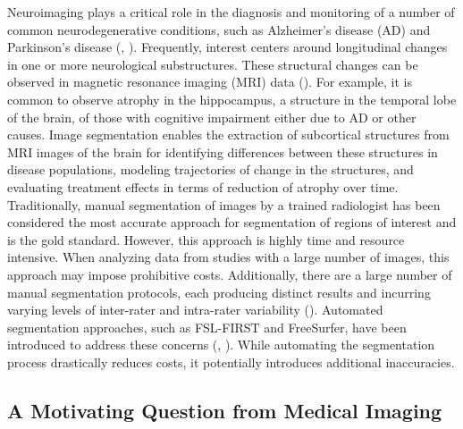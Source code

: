 \documentclass[12pt]{article}
\theoremstyle{definition}
\begin{document}
Neuroimaging plays a critical role in the diagnosis and monitoring of a number of common neurodegenerative conditions, such as Alzheimer's disease (AD) and Parkinson's disease (\cite{knopmanAlzheimerDisease2021}, \cite{poeweParkinsonDisease2017}). Frequently, interest centers around longitudinal changes in one or more neurological substructures. These structural changes can be observed in magnetic resonance imaging (MRI) data (\cite{crainiceanu2016tutorial}). For example, it is common to observe atrophy in the hippocampus, a structure in the temporal lobe of the brain, of those with  cognitive impairment either due to AD or other causes. Image segmentation enables the extraction of subcortical structures from MRI images of the brain for identifying differences between these structures in disease populations, modeling trajectories of change in the structures, and evaluating treatment effects in terms of reduction of atrophy over time. Traditionally, manual segmentation of images by a trained radiologist has been considered the most accurate approach for segmentation of regions of interest and is the gold standard. However, this approach is highly time and resource intensive. When analyzing data from studies with a large number of images, this approach may impose prohibitive costs. Additionally, there are a large number of manual segmentation protocols, each producing distinct results and incurring varying levels of inter-rater and intra-rater variability (\cite{boccardiSurveyProtocolsManual2011}). Automated segmentation approaches, such as FSL-FIRST and FreeSurfer, have been introduced to address these concerns (\cite{patenaudeBayesianModelShape2011}, \cite{reuterWithinsubjectTemplateEstimation2012}). While automating the segmentation process drastically reduces costs, it potentially introduces additional inaccuracies.


\subsection{A Motivating Question from Medical Imaging}
\end{document}
